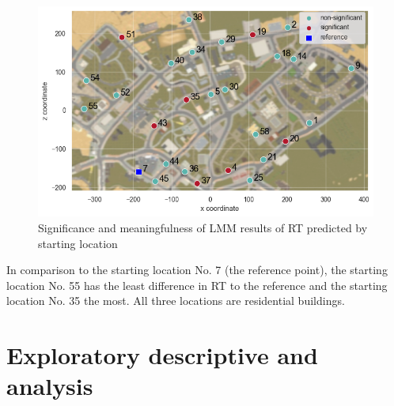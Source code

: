 \begin{figure}[h]
	\centering
	\includegraphics[width=150mm]{figures/significance_starting_locations_RT_map_23.png}
	\caption[Significance and meaningfulness (RT predicted by starting location)]{Significance and meaningfulness of LMM results of RT predicted by starting location}
	\label{fig:sig_RT_loc_map}
\end{figure}

In comparison to the starting location No. 7 (the reference point), the starting location No. 55 has the least difference in RT to the reference and the starting location No. 35 the most. All three locations are residential buildings.

\section{Exploratory descriptive and analysis}
